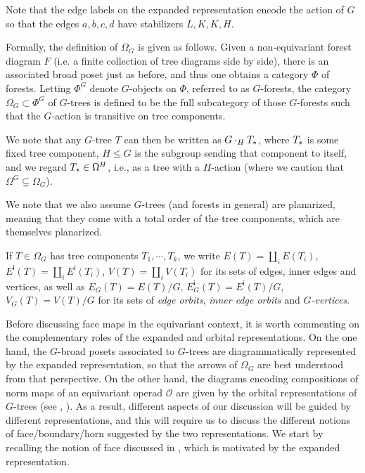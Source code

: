 \documentclass[a4paper,10pt
,draft
]{article}%
\begin{document}
Note that the edge labels on the expanded representation encode the action of $G$ so that the edges 
$a,b,c,d$ have stabilizers $L,K,K,H$.

Formally, the definition of $\Omega_G$ \cite[Def. 5.44]{Per17} is given as follows.
Given a non-equivariant forest diagram $F$ 
(i.e. a finite collection of tree diagrams side by side),
there is
an associated broad poset just as before, and thus one obtains a category $\Phi$ of forests.
Letting $\Phi^G$ denote $G$-objects on $\Phi$, referred to as $G$-forests,
the category
$\Omega_G \subset \Phi^G$
of $G$-trees
is defined to be the full subcategory of those $G$-forests such that the $G$-action is transitive on tree components.

We note that any $G$-tree $T$ can then be written as
$G \cdot_H T_{\**}$, where $T_{\**}$ is some fixed tree component, $H\leq G$ is the subgroup sending that component to itself,
and we regard $T_{\**} \in \Omega^H$, i.e., as a tree with a $H$-action (where we caution that $\Omega^G \subsetneq \Omega_G$).

We note that we also assume $G$-trees (and forests in general) are planarized, meaning that they come with a total order of the tree components, which are themselves planarized.

If $T\in \Omega_G$ has tree components $T_1,\cdots, T_k$, we write
$E(T) = \amalg_i E(T_i)$, 
$E^{\mathsf{i}}(T) = \amalg_i E^{\mathsf{i}}(T_i)$,
$V(T) = \amalg_i V(T_i)$
for its sets of edges, inner edges and vertices, as well as
$E_G(T) = E(T)/G$,
$E^{\mathsf{i}}_G(T) = E^{\mathsf{i}}(T)/G$,
$V_G(T) = V(T)/G$ for its sets of 
\textit{edge orbits},
\textit{inner edge orbits} and
\textit{$G$-vertices}.

Before discussing face maps in the equivariant context, it is worth commenting on the complementary roles of the expanded and orbital representations.
On the one hand, the $G$-broad posets associated to $G$-trees are diagrammatically represented by the expanded representation,
so that the arrows of $\Omega_{G}$ are best understood from that perspective.
On the other hand, the diagrams encoding compositions of norm maps of an equivariant operad $\mathcal{O}$
are given by the orbital representations of  
$G$-trees (see \cite[Ex. 4.9]{Per17}, \cite[(1.10)]{BP17}).
As a result, different aspects of our discussion will be guided by different representations, and this will require us to discuss the different notions of face/boundary/horn suggested by the two representations.
We start by recalling the notion of face discussed in \cite{Per17}, which is motivated by the expanded representation.
\end{document}
